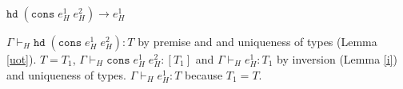 \begin{case}
$\mathtt{hd}\;(\mathtt{cons}\;e_{H}^{1}\;e_{H}^{2})\rightarrow e_{H}^{1}$

$\Gamma\vdash_{H}\mathtt{hd}\;(\mathtt{cons}\;e_{H}^{1}\;e_{H}^{2}):T$ by premise and and uniqueness of types (Lemma \ref{uot}).  $T=T_{1}$, $\Gamma\vdash_{H}\mathtt{cons}\;e_{H}^{1}\;e_{H}^{2}:[T_{1}]$ and $\Gamma\vdash_{H}e_{H}^{1}:T_{1}$ by inversion (Lemma \ref{i}) and uniqueness of types.  $\Gamma\vdash_{H}e_{H}^{1}:T$ because $T_{1}=T$.
\end{case}